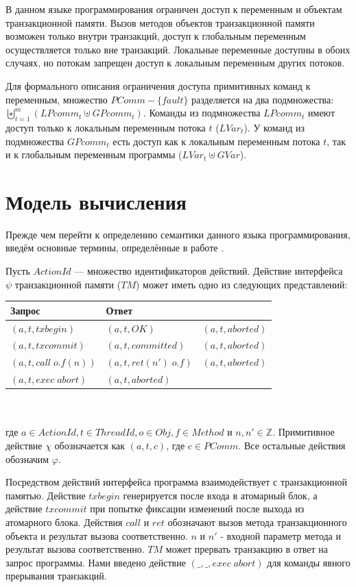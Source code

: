 В данном языке программирования ограничен доступ к переменным и объектам транзакционной памяти. Вызов методов объектов транзакционной памяти возможен только внутри транзакций, доступ к глобальным переменным осуществляется только вне транзакций. Локальные переменные доступны в обоих случаях, но потокам запрещен доступ к локальным переменным других потоков.

Для формального описания ограничения доступа примитивных команд к переменным, множество $PComm - \{fault\}$ разделяется на два подмножества: $\biguplus_{t=1}^m (LPcomm_t \uplus GPcomm_t)$. Команды из подмножества $LPcomm_t$ имеют доступ только к локальным переменным потока $t$ ($LVar_t$). У команд из подмножества $GPcomm_t$ есть доступ как к локальным переменным потока $t$, так и к глобальным переменным программы ($LVar_t \uplus GVar$). 

\section{Модель вычисления}
Прежде чем перейти к определению семантики данного языка программирования, введём основные термины, определённые в работе \cite{tms_article}. 

\begin{mydefinition}\label{def1} Пусть $ActionId$ --- множество идентификаторов действий. Действие интерфейса $\psi$ транзакционной памяти ($TM$) может иметь одно из следующих представлений:\\

\begin{tabular}{llr}
\hline
Запрос  & Ответ \\
\hline
$(a, t, txbegin)$ & $(a, t, OK)$ & $(a, t, aborted)$     \\
$(a, t, txcommit)$ & $(a, t, committed)$ & $(a, t, aborted)$ \\
$(a, t, call \; o.f(n))$ & $(a, t, ret (n') \; o.f)$ & $(a, t, aborted)$ \\
$(a, t, exec \; abort)$ & $(a, t, aborted)$ \\
\hline
\end{tabular}\\
\\
где $a \in ActionId, t \in ThreadId, o \in Obj, f \in Method$ и $n,n' \in \mathbb{Z}$. Примитивное действие $\chi$ обозначается как $(a, t, c)$, где $c \in PComm$. Все остальные действия обозначим $\varphi$.
\end{mydefinition}
Посредством действий интерфейса программа взаимодействует с транзакционной памятью.
Действие $txbegin$ генерируется после входа в атомарный блок, а действие $txcommit$ при попытке фиксации изменений после выхода из атомарного блока. Действия $call$ и $ret$ обозначают вызов метода транзакционного объекта и результат вызова соответственно. $n$ и $n'$ - входной параметр метода и результат вызова соответственно. $TM$ может прервать транзакцию в ответ на запрос программы. Нами введено действие $(\_, \_, exec \; abort)$ для команды явного прерывания транзакций. 

